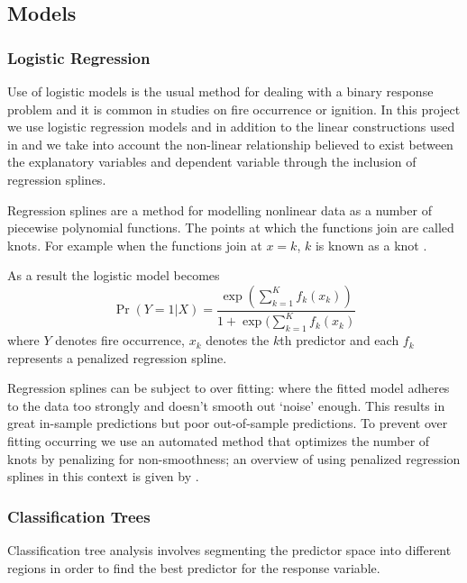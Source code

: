 \documentclass[11pt,a4paper]{article}
\begin{document}
\subsection{Models}

\subsubsection{Logistic Regression}

Use of logistic models is the usual method for dealing with a binary response problem and it is common in studies on fire occurrence or ignition.  In this project we use logistic regression models and in addition to the linear constructions used in \citet{andrews03} and \citet{del11} we take into account the non-linear relationship believed to exist between the explanatory variables and dependent variable through the inclusion of regression splines.

Regression splines are a method for modelling nonlinear data as a number of piecewise  polynomial functions. The points at which the functions join are called knots. For example when the functions join at $x=k$, $k$ is known as a knot \citep{ruppert03}.

As a result the logistic model becomes
\begin{equation}
  \label{eq logits}
  \Pr(Y=1|X)=\frac{\exp(\sum_{k=1}^K f_k(x_k))}{1+\exp(\sum_{k=1}^K f_k(x_k)}
\end{equation}
where $Y$ denotes fire occurrence, $x_k$ denotes the $k$th predictor and each $f_k$ represents a penalized regression spline.

Regression splines can be subject to over fitting: where the fitted model adheres to the data too strongly and doesn't smooth out `noise' enough. This results in great in-sample predictions but poor out-of-sample predictions. To prevent over fitting occurring we use an automated method that optimizes the number of knots by penalizing for non-smoothness; an overview of using penalized regression splines in this context is given by \citet{wood02}.

\subsubsection{Classification Trees}

Classification tree analysis involves segmenting the predictor space into different regions in order to find the best predictor for the response variable.
\end{document}

